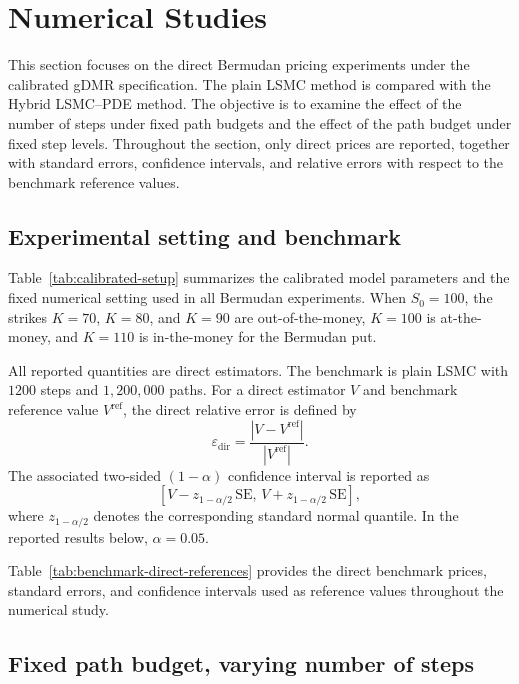 \section{Numerical Studies}\label{sec:numerical}

This section focuses on the direct Bermudan pricing experiments under the calibrated gDMR specification. The plain LSMC method is compared with the Hybrid LSMC--PDE method. The objective is to examine the effect of the number of steps under fixed path budgets and the effect of the path budget under fixed step levels. Throughout the section, only direct prices are reported, together with standard errors, confidence intervals, and relative errors with respect to the benchmark reference values.

\subsection{Experimental setting and benchmark}

Table~\ref{tab:calibrated-setup} summarizes the calibrated model parameters and the fixed numerical setting used in all Bermudan experiments. When \(S_0=100\), the strikes \(K=70\), \(K=80\), and \(K=90\) are out-of-the-money, \(K=100\) is at-the-money, and \(K=110\) is in-the-money for the Bermudan put.



All reported quantities are direct estimators. The benchmark is plain LSMC with \(1200\) steps and \(1{,}200{,}000\) paths. For a direct estimator \(V\) and benchmark reference value \(V^{\mathrm{ref}}\), the direct relative error is defined by
\[
\varepsilon_{\mathrm{dir}} = \frac{|V-V^{\mathrm{ref}}|}{|V^{\mathrm{ref}}|}.
\]
The associated two-sided \((1-\alpha)\) confidence interval is reported as
\[
[V-z_{1-\alpha/2}\,\mathrm{SE},\,V+z_{1-\alpha/2}\,\mathrm{SE}],
\]
where \(z_{1-\alpha/2}\) denotes the corresponding standard normal quantile. In the reported results below, \(\alpha=0.05\).

Table~\ref{tab:benchmark-direct-references} provides the direct benchmark prices, standard errors, and confidence intervals used as reference values throughout the numerical study.



\subsection{Fixed path budget, varying number of steps}


